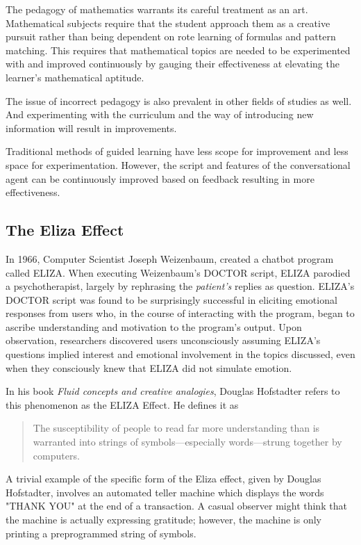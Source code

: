 \documentclass[]{article}
\begin{document}
The pedagogy of mathematics warrants its careful treatment as an art. Mathematical subjects require that the student approach them as a creative pursuit rather than being dependent on rote learning of formulas and pattern matching. This requires that mathematical topics are needed to be experimented with and improved continuously by gauging their effectiveness at elevating the learner's mathematical aptitude. 


The issue of incorrect pedagogy is also prevalent in other fields of studies as well. And experimenting with the curriculum and the way of introducing new information will result in improvements.

Traditional methods of guided learning have less scope for improvement and less space for experimentation. However, the script and features of the conversational agent can be continuously improved based on feedback resulting in more effectiveness.


\subsection[Eliza Effect]{The Eliza Effect}

In 1966, Computer Scientist Joseph Weizenbaum, created a chatbot program called ELIZA. When executing Weizenbaum's DOCTOR script, ELIZA parodied a psychotherapist, largely by rephrasing the \textit{patient's} replies as question. ELIZA's DOCTOR script was found to be surprisingly successful in eliciting emotional responses from users who, in the course of interacting with the program, began to ascribe understanding and motivation to the program's output. Upon observation, researchers discovered users unconsciously assuming ELIZA's questions implied interest and emotional involvement in the topics discussed, even when they consciously knew that ELIZA did not simulate emotion.

In his book \textit{Fluid concepts and creative analogies}\cite{hofstadter1995fluid}, Douglas Hofstadter refers to this phenomenon as the ELIZA Effect. He defines it as 
\begin{quote}
The susceptibility of people to read far more understanding than is warranted into strings of symbols—especially words—strung together by computers.
\end{quote}


A trivial example of the specific form of the Eliza effect, given by Douglas Hofstadter, involves an automated teller machine which displays the words "THANK YOU" at the end of a transaction. A casual observer might think that the machine is actually expressing gratitude; however, the machine is only printing a preprogrammed string of symbols.
\end{document}
